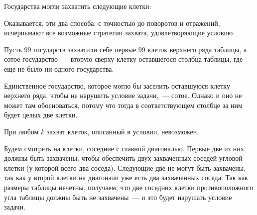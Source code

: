 ﻿
\begin{itemize}

\itA Государства могли захватить следующие клетки:

\smallskip
\begin{center} \end{center}

Оказывается, эти два способа, с точностью до поворотов и отражений, исчерпывают все возможные стратегии захвата, удовлетворяющие условию.

\itB Пусть 99 государств захватили себе первые 99 клеток верхнего ряда таблицы, а сотое государство~— вторую сверху клетку оставшегося столбца таблицы, где еще не было ни одного государства.

Единственное государство, которое могло бы заселить оставшуюся клетку верхнего ряда, чтобы не нарушить условие задачи,~— сотое. Однако и оно не может там обосноваться, потому что тогда в соответствующем столбце за ним будет целых две клетки.

\itC При любом $k$ захват клеток, описанный в условии, невозможен.

\begin{center}
\end{center}

Будем смотреть на клетки, соседние с главной диагональю. Первые две из них должны быть захвачены, чтобы обеспечить двух захваченных соседей угловой клетки (у которой всего два соседа). Следующие две не могут быть захвачены, так как у второй клетки на диагонали уже есть два захваченных соседа. Так как размеры таблицы нечетны, получаем, что две соседних клетки противоположного угла таблицы должны быть не захвачены~— и это будет нарушать условие задачи.
\end{itemize}